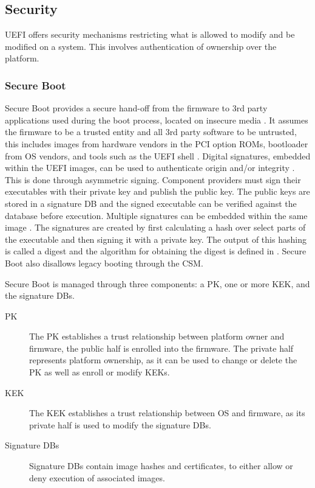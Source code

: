 
\subsection{Security}

\ac{UEFI} offers security mechanisms restricting what is allowed to modify and be modified on a system.
This involves authentication of ownership over the platform.

\subsubsection{Secure Boot}
\label{sec:uefi-pi:uefi:secure-boot}

Secure Boot provides a secure hand-off from the firmware to 3rd party applications used during the boot process, located on insecure media \cite{tianocore-understanding-uefi-secure-boot-chain} \cite[Sections 32.2 and 32.5.1]{uefi-spec}.
It assumes the firmware to be a trusted entity and all 3rd party software to be untrusted, this includes images from hardware vendors in the \ac{PCI} option \acp{ROM}, bootloader from \ac{OS} vendors, and tools such as the \ac{UEFI} shell \cite{tianocore-understanding-uefi-secure-boot-chain}.
Digital signatures, embedded within the \ac{UEFI} images, can be used to authenticate origin and/or integrity \cite[Section 32.2]{uefi-spec}.
This is done through asymmetric signing. Component providers must sign their executables with their private key and publish the public key.
The public keys are stored in a signature \ac{DB} and the signed executable can be verified against the database before execution.
Multiple signatures can be embedded within the same image \cite[Section 32.2.2]{uefi-spec}.
The signatures are created by first calculating a hash over select parts of the executable and then signing it with a private key.
The output of this hashing is called a digest and the algorithm for obtaining the digest is defined in \cite{microsoft-pe-signature-format}.
Secure Boot also disallows legacy booting through the \ac{CSM}.

Secure Boot is managed through three components: a \ac{PK}, one or more \ac{KEK}, and the signature \acp{DB}.

\begin{description}
    \item[\acl{PK}]
        The \ac{PK} establishes a trust relationship between platform owner and firmware, the public half is enrolled into the firmware.
        The private half represents platform ownership, as it can be used to change or delete the \ac{PK} as well as enroll or modify \acp{KEK}.
    \item[\acl{KEK}]
        The \ac{KEK} establishes a trust relationship between \ac{OS} and firmware, as its private half is used to modify the signature \acfp{DB}.
    \item[Signature \aclp{DB}]
        Signature \acp{DB} contain image hashes and certificates, to either allow or deny execution of associated images.
\end{description}

